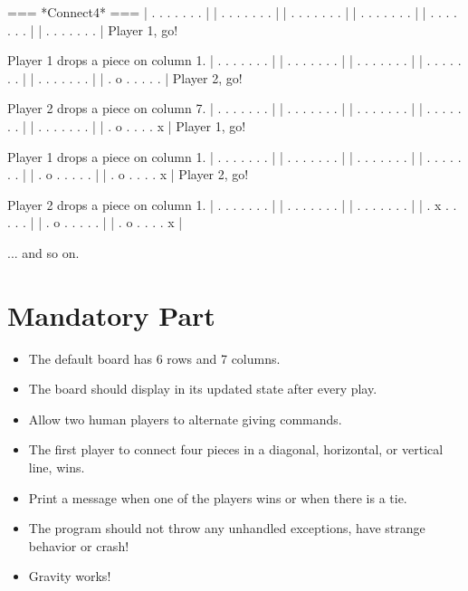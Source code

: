 \documentclass{42-en}
\begin{document}
\begin{42console}
=== *Connect4* ===
| . . . . . . . |
| . . . . . . . |
| . . . . . . . |
| . . . . . . . |
| . . . . . . . |
| . . . . . . . |
Player 1, go!

Player 1 drops a piece on column 1.
| . . . . . . . |
| . . . . . . . |
| . . . . . . . |
| . . . . . . . |
| . . . . . . . |
| . o . . . . . |
Player 2, go!

Player 2 drops a piece on column 7.
| . . . . . . . |
| . . . . . . . |
| . . . . . . . |
| . . . . . . . |
| . . . . . . . |
| . o . . . . x |
Player 1, go!

Player 1 drops a piece on column 1.
| . . . . . . . |
| . . . . . . . |
| . . . . . . . |
| . . . . . . . |
| . o . . . . . |
| . o . . . . x |
Player 2, go!

Player 2 drops a piece on column 1.
| . . . . . . . |
| . . . . . . . |
| . . . . . . . |
| . x . . . . . |
| . o . . . . . |
| . o . . . . x |
\end{42console}

... and so on.


\chapter{Mandatory Part}

\begin{itemize}

\item The default board has 6 rows and 7 columns.
\item The board should display in its updated state after every play.
\item Allow two human players to alternate giving commands.
\item The first player to connect four pieces in a diagonal, horizontal, or vertical line, wins.
\item Print a message when one of the players wins or when there is a tie.
\item The program should not throw any unhandled exceptions, have strange behavior or crash!
\item Gravity works!

\end{itemize}
\end{document}
